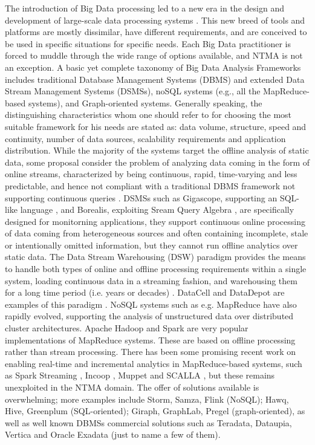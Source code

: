 \documentclass[10pt, conference, letterpaper]{IEEEtran}
\begin{document}
The introduction of Big Data processing led to a new era in the design and development of large-scale data processing systems \cite{stonebraker2010}. This new breed of tools and platforms are mostly dissimilar, have different requirements, and are conceived to be used in specific situations for specific needs. Each Big Data practitioner is forced to muddle through the wide range of options available, and NTMA is not an exception. A basic yet complete taxonomy of Big Data Analysis Frameworks includes traditional Database Management Systems (DBMS) and extended Data Stream Management Systems (DSMSs), noSQL systems (e.g., all the MapReduce-based systems), and Graph-oriented systems.
Generally speaking, the distinguishing characteristics whom one should refer to for choosing the most suitable framework for his needs are stated as: data volume, structure, speed and continuity, number of data sources, scalability requirements and application distribution. 
While the majority of the systems target the offline analysis of static data, some proposal consider the problem of analyzing data coming in the form of online streams, characterized by being continuous, rapid, time-varying and less predictable, and hence not compliant with a traditional DBMS framework not supporting continuous queries \cite{babcock2002}.  DSMSs such as Gigascope, supporting an SQL-like language \cite{cranor2003}, and Borealis, exploiting Sream Query Algebra \cite{abadi2003}, are specifically designed for monitorning applications, they support continuous online processing of data coming from heterogeneous sources and often containing incomplete, stale or intentionally omitted information, but they cannot run offline analytics over static data. The Data Stream Warehousing (DSW) paradigm provides the means to handle both types of online and offline processing requirements within a single system, loading continuous data in a streaming fashion, and warehousing them for a long time period (i.e. years or decades) \cite{golab2011}. DataCell and DataDepot are examples of this paradigm \cite{golab2009}. NoSQL systems such as e.g. MapReduce \cite{dean2008} have also rapidly evolved, supporting the analysis of unstructured data over distributed cluster architectures. Apache Hadoop \cite{white2009} and Spark \cite{zaharia2010} are very popular implementations of MapReduce systems. These are based on offline processing rather than stream processing. There has been some promising recent work on enabling real-time and incremental analytics in MapReduce-based systems, such as Spark Streaming \cite{zaharia2012}, Incoop \cite{indoop}, Muppet \cite{muppet} and SCALLA \cite{scalla}, but these remains unexploited in the NTMA domain. The offer of solutions available is overwhelming; more examples include Storm, Samza, Flink (NoSQL); Hawq, Hive, Greenplum (SQL-oriented); Giraph, GraphLab, Pregel (graph-oriented), as well as well known DBMSs commercial solutions such as Teradata, Dataupia, Vertica and Oracle Exadata (just to name a few of them). 
 
\end{document}
